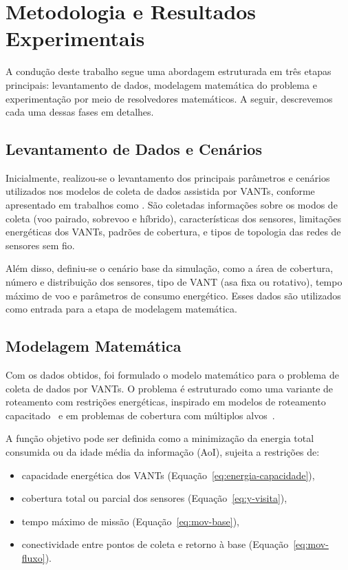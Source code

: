\chapter{Metodologia e Resultados Experimentais}
\label{sec:metodologia}

A condução deste trabalho segue uma abordagem estruturada em três etapas principais: levantamento de dados, modelagem matemática do problema e experimentação por meio de resolvedores matemáticos. A seguir, descrevemos cada uma dessas fases em detalhes.

\section{Levantamento de Dados e Cenários}

Inicialmente, realizou-se o levantamento dos principais parâmetros e cenários utilizados nos modelos de coleta de dados assistida por VANTs, conforme apresentado em trabalhos como \cite{wei2022survey,messaoudi2023survey,liu2018uavWSN}. São coletadas informações sobre os modos de coleta (voo pairado, sobrevoo e híbrido), características dos sensores, limitações energéticas dos VANTs, padrões de cobertura, e tipos de topologia das redes de sensores sem fio.

Além disso, definiu-se o cenário base da simulação, como a área de cobertura, número e distribuição dos sensores, tipo de VANT (asa fixa ou rotativo), tempo máximo de voo e parâmetros de consumo energético. Esses dados são utilizados como entrada para a etapa de modelagem matemática.

\section{Modelagem Matemática}

Com os dados obtidos, foi formulado o modelo matemático para o problema de coleta de dados por VANTs. O problema é estruturado como uma variante de roteamento com restrições energéticas, inspirado em modelos de roteamento capacitado~\cite{toth2002vrp} e em problemas de cobertura com múltiplos alvos~\cite{church1974maximal}.

A função objetivo pode ser definida como a minimização da energia total consumida ou da idade média da informação (AoI), sujeita a restrições de:

\begin{itemize}
\item capacidade energética dos VANTs (Equação~\eqref{eq:energia-capacidade}),
\item cobertura total ou parcial dos sensores (Equação~\eqref{eq:y-visita}),
\item tempo máximo de missão (Equação~\eqref{eq:mov-base}),
\item conectividade entre pontos de coleta e retorno à base (Equação~\eqref{eq:mov-fluxo}).
\end{itemize}

